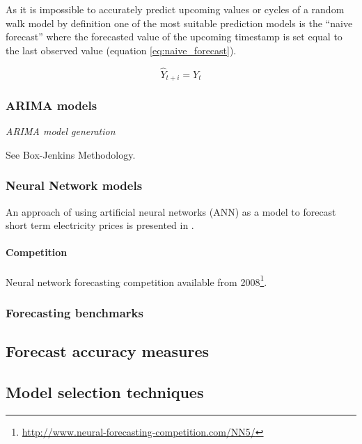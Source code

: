 As it is impossible to accurately predict upcoming values or cycles of a random walk model by definition one of the most suitable prediction models is the ``naive forecast'' where the forecasted value of the upcoming timestamp is set equal to the last observed value (equation \ref{eq:naive_forecast}).

\begin{equation}
\hat{Y}_{t+i} = Y_t
\label{eq:naive_forecast}
\end{equation}



\subsubsection{ARIMA models}

\emph{ARIMA model generation}

See Box-Jenkins Methodology. 


\subsubsection{Neural Network models}

An approach of using artificial neural networks (ANN) as a model to forecast short term electricity prices is presented in \cite{szkuta1999electricity}. 


\paragraph{Competition}

Neural network forecasting competition available from 2008\footnote{\url{http://www.neural-forecasting-competition.com/NN5/}}. 




\subsubsection{Forecasting benchmarks}






\subsection{Forecast accuracy measures}


\subsection{Model selection techniques}



